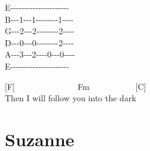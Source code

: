 \documentclass[
  letterpaper,
  a5paper]{memoir}
\begin{document}
E-\/-\/-\/-\/-\/-\/-\/-\/-\/-\/-\/-\/-\/-\/-\/-\/-\/-\/-\/-\/-\textbar{}\\
B-\/-\/-1-\/-\/-1-\/-\/-\/-\/-\/-\/-\/-1-\/-\/-\/-\textbar{}\\
G-\/-\/-2-\/-\/-2-\/-\/-\/-\/-\/-\/-\/-2-\/-\/-\/-\textbar{}\\
D-\/-\/-0-\/-\/-0-\/-\/-\/-\/-\/-\/-\/-2-\/-\/-\/-\textbar{}\\
A-\/-\/-3-\/-\/-2-\/-\/-\/-0-\/-\/-0-\/-\/-\/-\textbar{}\\
E-\/-\/-\/-\/-\/-\/-\/-\/-\/-\/-\/-\/-\/-\/-\/-\/-\/-\/-\/-\/-\textbar{}

{[}F{]}~~~~~~~~~~~~~~~Fm~~~~~~~~~~~{[}C{]}~~~\\
Then I will follow you into the dark

\hypertarget{suzanne}{%
\chapter{Suzanne}\label{suzanne}}
\end{document}
